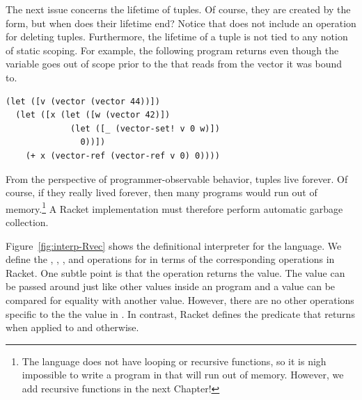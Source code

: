 \documentclass[11pt]{book}
\begin{document}
The next issue concerns the lifetime of tuples. Of course, they are
created by the  form, but when does their lifetime end?
Notice that \LangVec{} does not include an operation for deleting
tuples. Furthermore, the lifetime of a tuple is not tied to any notion
of static scoping. For example, the following program returns
 even though the variable  goes out of scope prior to
the  that reads from the vector it was bound to.
\begin{center}
\begin{minipage}{0.96\textwidth}
\begin{lstlisting}
(let ([v (vector (vector 44))])
  (let ([x (let ([w (vector 42)])
             (let ([_ (vector-set! v 0 w)])
               0))])
    (+ x (vector-ref (vector-ref v 0) 0))))
\end{lstlisting}
\end{minipage}
\end{center}

From the perspective of programmer-observable behavior, tuples live
forever. Of course, if they really lived forever, then many programs
would run out of memory.\footnote{The \LangVec{} language does not have
  looping or recursive functions, so it is nigh impossible to write a
  program in \LangVec{} that will run out of memory. However, we add
  recursive functions in the next Chapter!} A Racket implementation
must therefore perform automatic garbage collection.

Figure~\ref{fig:interp-Rvec} shows the definitional interpreter for the
\LangVec{} language. We define the , ,
, and  operations for \LangVec{} in
terms of the corresponding operations in Racket. One subtle point is
that the   operation returns the 
value. The  value can be passed around just like other
values inside an \LangVec{} program and a  value can be
compared for equality with another  value. However,
there are no other operations specific to the the 
value in \LangVec{}. In contrast, Racket defines the  predicate
that returns  when applied to  and 
otherwise.
\end{document}
